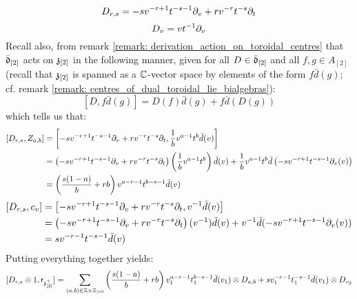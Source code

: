 \begin{remark}
\begin{enumerate}
\begin{enumerate}
\begin{enumerate}
                                $$D_{r, s} = -s v^{-r + 1} t^{-s - 1} \partial_v + r v^{-r} t^{-s} \partial_t$$
                                $$D_v = v t^{-1} \partial_v$$
                            Recall also, from remark \ref{remark: derivation_action_on_toroidal_centres} that $\bar{\mathfrak{d}}_{[2]}$ acts on $\mathfrak{z}_{[2]}$ in the following manner, given for all $D \in \bar{\mathfrak{d}}_{[2]}$ and all $f, g \in A_{[2]}$ (recall that $\mathfrak{z}_{[2]}$ is spanned as a $\mathbb{C}$-vector space by elements of the form $f \bar{d}(g)$; cf. remark \ref{remark: centres_of_dual_toroidal_lie_bialgebras}):
                                $$[D, f \bar{d}(g)] = D(f) \bar{d}(g) + f \bar{d}( D(g) )$$
                            which tells us that:
                                $$
                                    \begin{aligned}
                                        [D_{r, s}, Z_{a, b}] & = \left[ -s v^{-r + 1} t^{-s - 1} \del_v + r v^{-r} t^{-s} \del_t, \frac1b v^{a - 1} t^b \bar{d}(v) \right]
                                        \\
                                        & = \left( -s v^{-r + 1} t^{-s - 1} \del_v + r v^{-r} t^{-s} \del_t \right)\left( \frac1b v^{a - 1} t^b \right) \bar{d}(v) + \frac1b v^{a - 1} t^b \bar{d}\left( -s v^{-r + 1} t^{-s - 1} \del_v(v) \right)
                                        \\
                                        & = \left( \frac{s(1 - a)}{b} + rb  \right) v^{a - r - 1} t^{b - s - 1} \bar{d}(v)
                                    \end{aligned}
                                $$
                                $$
                                    \begin{aligned}
                                        [D_{r, s}, c_v] & = \left[ -s v^{-r + 1} t^{-s - 1} \del_v + r v^{-r} t^{-s} \del_t, v^{-1} \bar{d}(v) \right]
                                        \\
                                        & = \left( -s v^{-r + 1} t^{-s - 1} \del_v + r v^{-r} t^{-s} \del_t \right)(v^{-1}) \bar{d}(v) + v^{-1} \bar{d}( -s v^{-r + 1} t^{-s - 1} \del_v(v) )
                                        \\
                                        & = s v^{-r - 1} t^{-s - 1} \bar{d}(v)
                                    \end{aligned}
                                $$
                            Putting everything together yields:
                                $$[D_{r, s} \tensor 1, \sfr_{\z_{[2]}^+}] = \sum_{(a, b) \in \Z \x \Z_{> 0}} \left( \frac{s(1 - a)}{b} + rb  \right) v_1^{a - r - 1} t_1^{b - s - 1} \bar{d}(v_1) \tensor D_{a, b} + s v_1^{-r - 1} t_1^{-s - 1} \bar{d}(v_1) \tensor D_{v_2}$$


\end{enumerate}
\end{enumerate}
\end{enumerate}
\end{remark}
